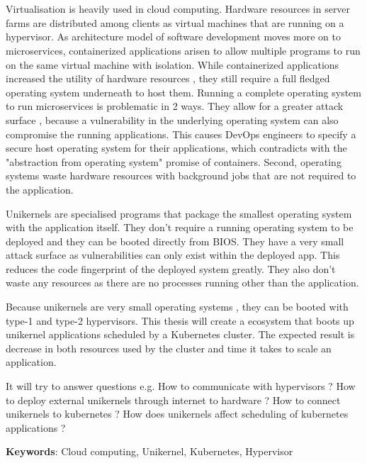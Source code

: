 \chapter{\abstractname}


Virtualisation is heavily used in cloud computing. Hardware resources in server farms are distributed among clients as virtual machines that are running on a hypervisor. As architecture model of software development moves more on to microservices, containerized applications arisen to allow multiple programs to run on the same virtual machine with isolation. While containerized applications increased the utility of hardware resources , they still require a full fledged operating system underneath to host them.
Running a complete operating system to run microservices is problematic in 2 ways. They allow for a greater attack surface , because a vulnerability in the underlying operating system can also compromise the running applications. This causes DevOps engineers to specify a secure host operating system for their applications, which contradicts with the "abstraction from operating system" promise of containers. Second, operating systems waste hardware resources with background jobs that are not required to the application. 

Unikernels are specialised programs that package the smallest operating system with the application itself. They don't require a running operating system to be deployed and they can be booted directly from BIOS. They have a very small attack surface as vulnerabilities can only exist within the deployed app. This reduces the code fingerprint of the deployed system greatly. They also don't waste any resources as there are no processes running other than the application. 

Because unikernels are very small operating systems , they can be booted with type-1 and type-2 hypervisors. This thesis will create a ecosystem that boots up unikernel applications scheduled by a Kubernetes cluster. The expected result is  decrease in both resources used by the cluster and time it takes to scale an application.

It will try to answer questions e.g. How to communicate with hypervisors ? How to deploy external unikernels through internet to hardware ? How to connect unikernels to kubernetes ? How does unikernels affect scheduling of kubernetes applications ?

 \textbf{Keywords}: Cloud computing, Unikernel, Kubernetes, Hypervisor
